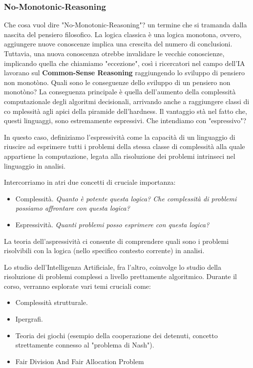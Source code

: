 \subsubsection{No-Monotonic-Reasoning}
Che cosa vuol dire "No-Monotonic-Reasoning"?  un termine che si tramanda dalla nascita del pensiero filosofico.
La logica classica è una logica monotona, ovvero, aggiungere nuove conoscenze implica una crescita del numero di conclusioni.
\newline
Tuttavia, una nuova conoscenza otrebbe invalidare le vecchie conoscienze, implicando quella che chiamiamo "eccezione", così i ricercatori
nel campo dell'IA lavorano sul \textbf{Common-Sense Reasoning} raggiungendo lo sviluppo di pensiero non monotòno.
\newline
Quali sono le conseguenze dello sviluppo di un pensiero non monotòno?
\newline
La conseguenza principale è quella dell'aumento della complessità computazionale degli algoritmi decisionali, arrivando anche a raggiungere 
classi di co mplessità agli apici della piramide dell'hardness.
Il vantaggio stà nel fatto che, questi linguaggi, sono estremamente espressivi.  
\newline
Che intendiamo con "espressivo"?
\begin{definition}
    In questo caso, definiziamo l'espressività come la capacità di un linguaggio di riuscire ad esprimere tutti i problemi della 
    stessa classe di complessità alla quale appartiene la computazione, legata alla risoluzione dei problemi intrinseci nel 
    linguaggio in analisi.
\end{definition}
Intercorriamo in atri due concetti di cruciale importanza:
\begin{itemize}
    \item Complessità. \textit{Quanto è potente questa logica? Che complessità di problemi possiamo affrontare con questa logica?}
    \item Espressività. \textit{Quanti problemi posso esprimere con questa logica?}
\end{itemize}
La teoria dell'aspressività ci consente di comprendere quali sono i problemi risolvibili con la logica (nello specifico contesto corrente) in analisi.

\newpage
Lo studio dell'Intelligenza Artificiale, fra l'altro, coinvolge lo studio della risoluzione di problemi complessi a livello prettamente algoritmico.
Durante il corso, verranno esplorate vari temi cruciali come: 
\begin{itemize}
    \item Complessità strutturale.
    \item Ipergrafi.
    \item Teoria dei giochi (esempio della cooperazione dei detenuti, concetto strettamente connesso al "problema di Nash").
    \item Fair Division And Fair Allocation Problem
\end{itemize}
